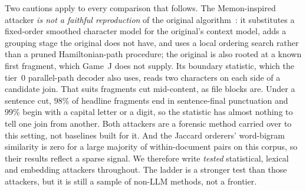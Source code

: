 \documentclass[sigconf,review]{acmart}
\begin{document}

Two cautions apply to every comparison that follows. The Memon-inspired
attacker \emph{is not a faithful reproduction} of the original
algorithm~\cite{shanmugasundaram2003}: it substitutes a fixed-order smoothed
character model for the original's context model, adds a grouping stage the
original does not have, and uses a local ordering search rather than a pruned
Hamiltonian-path procedure; the original is also rooted at a known first
fragment, which Game~J does not supply. Its boundary statistic, which the
tier~0 parallel-path decoder also uses, reads two characters on each side of a
candidate join. That suits fragments cut mid-content, as file blocks are.
Under a sentence cut, $98\%$ of headline fragments end in sentence-final
punctuation and $99\%$ begin with a capital letter or a digit, so the
statistic has almost nothing to tell one join from another. Both attackers are
a forensic method carried over to this setting, not baselines built for it.
And the Jaccard orderers' word-bigram
similarity is zero for a large majority of within-document pairs on this
corpus, so their results reflect a sparse signal. We therefore write
\emph{tested} statistical, lexical and embedding attackers throughout. The
ladder is a stronger test than those attackers, but it is still a sample of
non-LLM methods, not a frontier.
\end{document}
